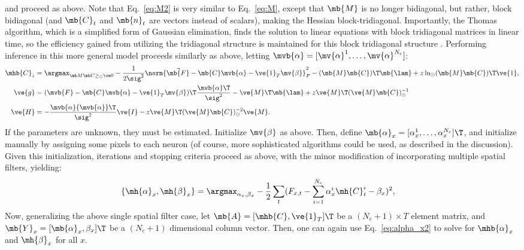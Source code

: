 \noindent and proceed as above.  Note that Eq.~\eqref{eq:M2} is very similar to Eq.~\eqref{eq:M}, except that $\mb{M}$ is no longer bidiagonal, but rather, block bidiagonal (and $\mb{C}_t$ and $\mb{n}_t$ are vectors instead of scalars), making the Hessian block-tridiagonal.  Importantly, the Thomas algorithm, which is a simplified form of Gaussian elimination, finds the solution to linear equations with block tridiagonal matrices in linear time, so the efficiency gained from utilizing the tridiagonal structure is maintained for this block tridiagonal structure \cite{Press92}.   Performing inference in this more general model proceeds similarly as above, letting $\mvb{\alpha}=[\mv{\alpha}^1, \ldots, \mv{\alpha}^{N_c}]$:
\begin{align} 
\mhb{C}_{\zzz} 
&= \az  -\frac{1}{2 \sig^2} \norm{\vec{\mb{F}} - \mb{C} \mvb{\alpha} - \ve{1}_T \mv{\beta}}_F^2 - (\mb{M} \mb{C} )\T \mb{\lam}  + \zzz \ln_\odot(\mb{M} \mb{C})\T\ve{1},  \label{eq:eta5}\\
\ve{g} &= (\mvb{F} - \mb{C} \mvb{\alpha} - \ve{1}_T \mv{\beta})\T\frac{{\mvb{\alpha}}\T}{\sig^2} - \ve{M}\T\mb{\lam} + \zzz \ve{M}\T (\ve{M} \mb{C})^{-1}_\odot \label{eq:g3} \\
\ve{H} &= -\frac{\mvb{\alpha} {\mvb{\alpha}}\T}{\sig^2} \ve{I} - \zzz \ve{M}\T (\ve{M} \mb{C})^{-2}_\odot \ve{M}. \label{eq:H3}
\end{align}
If the parameters are unknown, they must be estimated. Initialize $\mv{\beta}$ as above.  Then, define $\mb{\alpha}_x =[\alpha_x^1, \ldots, \alpha_x^{N_c}]\T$, and initialize manually by assigning some pixels to each neuron (of course, more sophisticated algorithms could be used, as described in the discussion).  Given this initialization, iterations and stopping criteria proceed as above, with the minor modification of incorporating multiple spatial filters, yielding:
\begin{align}
\{\mh{\alpha}_x,\mh{\beta}_x\}	&= \argmax_{\alpha_x,\beta_x} -\frac{1}{2} \sum_t  (F_{x,t} - \sum_{i=1}^{N_c} \alpha^i_x \mh{C}^i_t - \beta_x)^2, \label{eq:alpha_x3}
\end{align}
Now, generalizing the above single spatial filter case, let $\mb{A}=[\mhb{C}, \ve{1}_T]\T$ be a $(N_c+1) \times T$ element matrix, and $\mb{Y}_x=[\mb{\alpha}_x, \beta_x]\T$ be a $(N_c+1)$ dimensional column vector. Then, one can again use Eq.~\eqref{eq:alpha_x2} to solve for $\mhb{\alpha}_x$ and $\mh{\beta}_x$ for all $x$.



